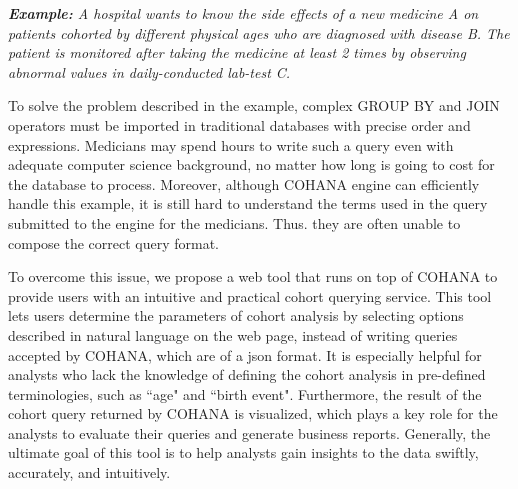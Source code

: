 \emph{\textbf{Example:} A hospital wants to know the side effects of a new medicine A on patients cohorted by different physical ages who are diagnosed with disease B. The patient is monitored after taking the medicine at least 2 times by observing abnormal values in daily-conducted lab-test C.}

To solve the problem described in the example, complex GROUP BY and JOIN operators must be imported in traditional databases with precise order and expressions.
Medicians may spend hours to write such a query even with adequate computer science background, no matter how long is going to cost for the database to process.
Moreover, although COHANA engine can efficiently handle this example, it is still hard to understand the terms used in the query submitted to the engine for the medicians.
Thus. they are often unable to compose the correct query format.



To overcome this issue, we propose a web tool that runs on top of COHANA to provide users with an intuitive and practical cohort querying service. 
This tool lets users determine the parameters of cohort analysis by selecting options described in natural language on the web page, instead of writing queries accepted by COHANA, which are of a json format.  
It is especially helpful for analysts who lack the knowledge of defining the cohort analysis in pre-defined terminologies, such as ``age" and ``birth event". 
Furthermore, the result of the cohort query returned by COHANA is visualized,
which plays a key role for the analysts to evaluate their queries and generate business reports.
Generally, the ultimate goal of this tool is to help analysts gain insights to the data swiftly, accurately, and intuitively.


